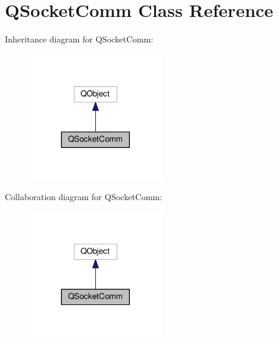 \hypertarget{class_q_socket_comm}{\section{Q\+Socket\+Comm Class Reference}
\label{class_q_socket_comm}
}


Inheritance diagram for Q\+Socket\+Comm\+:\nopagebreak
\begin{figure}[H]
\begin{center}
\leavevmode
\includegraphics[width=164pt]{class_q_socket_comm__inherit__graph}
\end{center}
\end{figure}


Collaboration diagram for Q\+Socket\+Comm\+:\nopagebreak
\begin{figure}[H]
\begin{center}
\leavevmode
\includegraphics[width=164pt]{class_q_socket_comm__coll__graph}
\end{center}
\end{figure}
